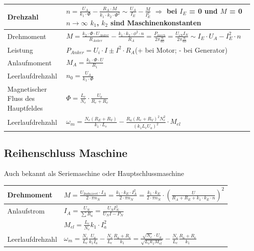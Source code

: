     	
        \renewcommand{\arraystretch}{2}
        \begin{tabular}[c]{ | p{6cm} | p{11cm} |}
            \hline
            Drehzahl &
            $ n= \frac{U_A}{k_1 \cdot \Phi} - \frac{R_A \cdot M}{k_1 \cdot k_2 \cdot \Phi^2} \sim \frac{U_A}{I_E} - \frac{M}{I_E^2}$ \newline
            $\Longrightarrow $ bei $I_E$ = 0 und $M$ = 0 $n \rightarrow \infty$ \newline 
            $k_1$, $k_2$ sind Maschinenkonstanten \\
            \hline
            Drehmoment &
            $M=\frac{k_2 \cdot \Phi \cdot U_{Anker}}{R_{Anker}} - \frac{k_1 \cdot k_2 \cdot\phi^2 \cdot n}{R_A} =\frac{P_{mech}}{2\pi \frac{n}{60}}=\frac{U_{iN}I_N}{2\pi \frac{n}{60}}\sim I_E \cdot U_A - I_E ^2 \cdot n$\\
            \hline
            Leistung &
            $P_{Anker}= U_i \cdot I \pm I^2 \cdot R_A $(+ bei Motor; - bei Generator) \\
            \hline
            Anlaufmoment &
            $M_A = \frac{k_1 \cdot \Phi \cdot U}{R_1}$ \\
            \hline
            Leerlaufdrehzahl &
            $n_0 = \frac{U_A}{k_1 \cdot \Phi}$ \\
            \hline
            Magnetischer Fluss des Hauptfeldes & 
            $\Phi=\frac{L_e}{N_e}\cdot\frac{U_a}{R_e+R_v}$\\
            \hline
            Leerlaufdrehzahl &
            $\omega_m=\frac{N_e\left(R_E+R_V\right)}{k_1\cdot
            L_e}-\frac{R_a\left(R_e+R_V\right)^2N_e^2}{\left(k_1L_eU_a\right)^2}\cdot
            M_{el}$\\
            \hline
        \end{tabular}
        \renewcommand{\arraystretch}{1.5}
        
    \subsection{Reihenschluss Maschine}
    Auch bekannt als Seriemaschine oder Hauptschlussmaschine\\
        \renewcommand{\arraystretch}{2}
        \begin{tabular}[c]{ | p{6cm} | p{9cm} |}
            \hline
            Drehmoment &
            $ M=  \frac{U_{Induziert} \cdot I_A}{2 \cdot \pi n_N} = \frac{k_1 \cdot k_E \cdot I_A ^2}{2\cdot \pi n_N}= \frac{k_1 \cdot k_E}{2 \cdot \pi n_N}\cdot(\frac{U}{R_A + R_E + k_1 \cdot k_E \cdot n})^2$ \\
            \hline
            Anlaufstrom &
            $I_A=\frac{U_N}{\sum R_a}=\frac{U_N I_N^2}{U_N I-P_N}$ \\
            \hline
            & $M_{el}=\frac{L_e}{N_e}k_1\cdot I_a^2$\\
            \hline
            Leerlaufdrehzahl &
            $\omega_m=\frac{N_e}{L_e}\frac{U_a}{k_1I_a}-\frac{N_e}{L_e}\frac{R_a+R_e}{k_1}=\frac{\sqrt{N_e}\cdot
            U_a}{\sqrt{L_ek_1M_{el}}}-\frac{N_e}{L_e}\frac{R_a+R_e}{k_1}$\\
            \hline
        \end{tabular}
        \renewcommand{\arraystretch}{1.5}